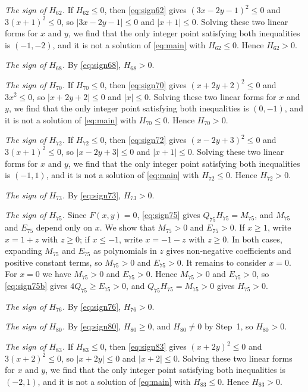 \documentclass[11pt]{article}
\begin{document}
\emph{The sign of $H_{62}$.} If $H_{62}\leq0$, then \eqref{eq:sign62} gives $(3x-2y-1)^2\leq 0$ and $3(x+1)^2\leq 0$, so $|3x-2y-1|\leq0$ and $|x+1|\leq0$. Solving these two linear forms for $x$ and $y$, we find that the only integer point satisfying both inequalities is $(-1,-2)$, and it is not a solution of \eqref{eq:main} with $H_{62}\leq0$. Hence $H_{62}>0$.

\emph{The sign of $H_{68}$.} By \eqref{eq:sign68}, $H_{68}>0$.

\emph{The sign of $H_{70}$.} If $H_{70}\leq0$, then \eqref{eq:sign70} gives $(x+2y+2)^2\leq 0$ and $3x^2\leq 0$, so $|x+2y+2|\leq0$ and $|x|\leq0$. Solving these two linear forms for $x$ and $y$, we find that the only integer point satisfying both inequalities is $(0,-1)$, and it is not a solution of \eqref{eq:main} with $H_{70}\leq0$. Hence $H_{70}>0$.

\emph{The sign of $H_{72}$.} If $H_{72}\leq0$, then \eqref{eq:sign72} gives $(x-2y+3)^2\leq 0$ and $3(x+1)^2\leq 0$, so $|x-2y+3|\leq0$ and $|x+1|\leq0$. Solving these two linear forms for $x$ and $y$, we find that the only integer point satisfying both inequalities is $(-1,1)$, and it is not a solution of \eqref{eq:main} with $H_{72}\leq0$. Hence $H_{72}>0$.

\emph{The sign of $H_{73}$.} By \eqref{eq:sign73}, $H_{73}>0$.

\emph{The sign of $H_{75}$.} Since $F(x,y)=0$, \eqref{eq:sign75} gives $Q_{75}H_{75}=M_{75}$, and $M_{75}$ and $E_{75}$ depend only on $x$. We show that $M_{75}>0$ and $E_{75}>0$. If $x\geq1$, write $x=1+z$ with $z\geq0$; if $x\leq-1$, write $x=-1-z$ with $z\geq0$. In both cases, expanding $M_{75}$ and $E_{75}$ as polynomials in $z$ gives non-negative coefficients and positive constant terms, so $M_{75}>0$ and $E_{75}>0$. It remains to consider $x=0$. For $x=0$ we have $M_{75}>0$ and $E_{75}>0$. Hence $M_{75}>0$ and $E_{75}>0$, so \eqref{eq:sign75b} gives $4Q_{75}\geq E_{75}>0$, and $Q_{75}H_{75}=M_{75}>0$ gives $H_{75}>0$.

\emph{The sign of $H_{76}$.} By \eqref{eq:sign76}, $H_{76}>0$.

\emph{The sign of $H_{80}$.} By \eqref{eq:sign80}, $H_{80}\geq0$, and $H_{80}\neq0$ by Step~1, so $H_{80}>0$.

\emph{The sign of $H_{83}$.} If $H_{83}\leq0$, then \eqref{eq:sign83} gives $(x+2y)^2\leq 0$ and $3(x+2)^2\leq 0$, so $|x+2y|\leq0$ and $|x+2|\leq0$. Solving these two linear forms for $x$ and $y$, we find that the only integer point satisfying both inequalities is $(-2,1)$, and it is not a solution of \eqref{eq:main} with $H_{83}\leq0$. Hence $H_{83}>0$.
\end{document}
